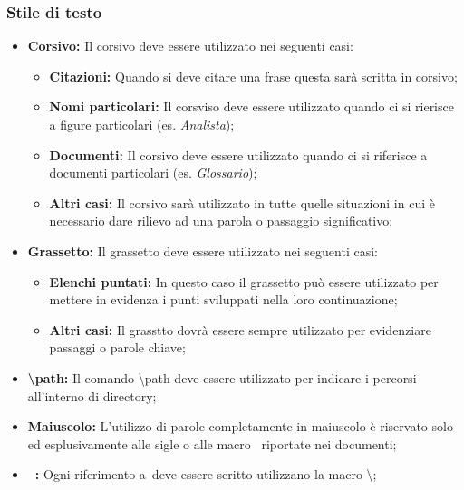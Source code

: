       \subsubsection{Stile di testo}
        \begin{itemize}
          \item \textbf{Corsivo: }Il corsivo deve essere utilizzato nei seguenti casi:
            \bgroup
              \begin{itemize}
                \item \textbf{Citazioni: }Quando si deve citare una frase questa sarà scritta in corsivo;
                \item \textbf{Nomi particolari: }Il corsviso deve essere utilizzato quando ci si rierisce a figure particolari (es. \emph{Analista});
                \item \textbf{Documenti: }Il corsivo deve essere utilizzato quando ci si riferisce a documenti particolari (es. \emph{Glossario});
                \item \textbf{Altri casi: }Il corsivo sarà utilizzato in tutte quelle situazioni in cui è necessario dare rilievo ad una parola o passaggio
                significativo;
              \end{itemize}
            \egroup
          \item \textbf{Grassetto: }Il grassetto deve essere utilizzato nei seguenti casi:
            \bgroup
              \begin{itemize}
                \item \textbf{Elenchi puntati: }In questo caso il grassetto può essere utilizzato per mettere in evidenza i punti sviluppati nella loro continuazione;
                \item \textbf{Altri casi: }Il grasstto dovrà essere sempre utilizzato per evidenziare passaggi o parole chiave;
              \end{itemize}
            \egroup
          \item \textbf{\textbackslash path: }Il comando \textbackslash path deve essere utilizzato per indicare i percorsi all'interno di directory;
          \item \textbf{Maiuscolo: }L'utilizzo di parole completamente in maiuscolo è riservato solo ed esplusivamente alle sigle o alle macro \glossaryItem{\LaTeX}\ riportate
          nei documenti;
          \item \textbf{\glossaryItem{\LaTeX}\ : }Ogni riferimento a\glossaryItem{\LaTeX}\ deve essere scritto utilizzano la macro \textbackslash \glossaryItem{\LaTeX};
        \end{itemize}

